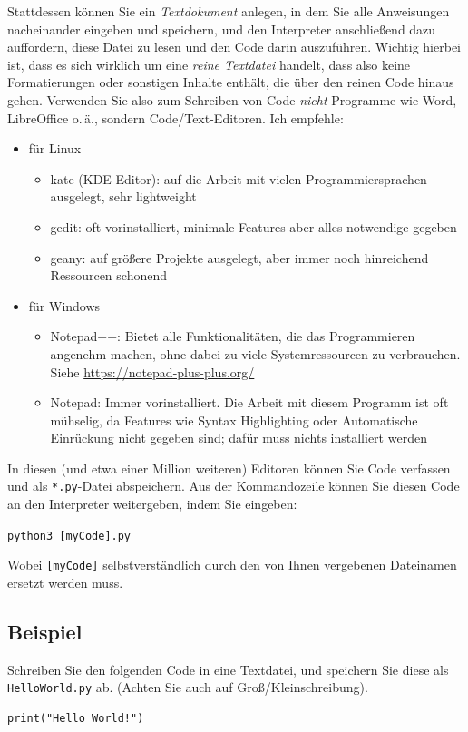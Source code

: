 Stattdessen können Sie ein \emph{Textdokument} anlegen, in dem Sie alle Anweisungen nacheinander eingeben und speichern, und den Interpreter anschließend dazu auffordern, diese Datei zu lesen und den Code darin auszuführen. Wichtig hierbei ist, dass es sich wirklich um eine \emph{reine Textdatei} handelt, dass also keine Formatierungen oder sonstigen Inhalte enthält, die über den reinen Code hinaus gehen. Verwenden Sie also zum Schreiben von Code \emph{nicht} Programme wie Word, LibreOffice o.\,ä., sondern Code/Text-Editoren. Ich empfehle:
\begin{itemize}
\item für Linux
	\begin{itemize}
	\item kate (KDE-Editor): auf die Arbeit mit vielen Programmiersprachen ausgelegt, sehr lightweight
	\item gedit: oft vorinstalliert, minimale Features aber alles notwendige gegeben
	\item geany: auf größere Projekte ausgelegt, aber immer noch hinreichend Ressourcen schonend
	\end{itemize}
\item für Windows
	\begin{itemize}
	\item Notepad++: Bietet alle Funktionalitäten, die das Programmieren angenehm machen, 
		ohne dabei zu viele Systemressourcen zu verbrauchen.\\
		Siehe \url{https://notepad-plus-plus.org/}
	\item Notepad: Immer vorinstalliert. Die Arbeit mit diesem Programm ist oft mühselig, da Features
		wie Syntax Highlighting oder Automatische Einrückung nicht gegeben sind; dafür muss nichts
		installiert werden
	\end{itemize}
\end{itemize}

In diesen (und etwa einer Million weiteren) Editoren können Sie Code verfassen und als \texttt{*.py}-Datei abspeichern. Aus der Kommandozeile können Sie diesen Code an den Interpreter weitergeben, indem Sie eingeben:
\begin{center}
\texttt{python3 [myCode].py}
\end{center}
Wobei \texttt{[myCode]} selbstverständlich durch den von Ihnen vergebenen Dateinamen ersetzt werden muss.


\subsection{Beispiel}
Schreiben Sie den folgenden Code in eine Textdatei, und speichern Sie diese als \texttt{HelloWorld.py} ab. (Achten Sie auch auf Groß/Kleinschreibung).
\begin{codebox}
\begin{verbatim}
print("Hello World!")
\end{verbatim}
\end{codebox}

